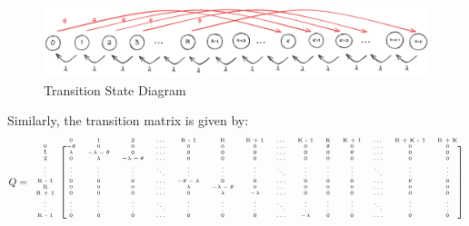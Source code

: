 \documentclass[12pt]{article}
\newcommand{\matindexx}[1]{\mbox{\tiny#1}}%
\begin{document}
\begin{figure}[H]
    \centering
    \includegraphics[width=\textwidth]{Images/Q1.png}
    \caption{Transition State Diagram}
    \label{fig:1-tsd}
\end{figure} 

\noindent Similarly, the transition matrix is given by: \begin{equation*}
    Q = \tiny\begin{blockarray}{ccccccccccccccc}
        & \matindexx{0} & \matindexx{1} & \matindexx{2} & \matindexx{\dots} & \matindexx{R - 1} & \matindexx{R} & \matindexx{R + 1} & \matindexx{\dots} & \matindexx{K - 1} & \matindexx{K} & \matindexx{K + 1} & \matindexx{\dots} & \matindexx{R + K - 1} & \matindexx{R + K} \\ 
        \begin{block}{c[cccccccccccccc]}
            \matindexx{0} & -\theta & 0 & 0 & \dots & 0 & 0 & 0 & \dots & 0 & \theta & 0 & \dots & 0 & 0 \\
            \matindexx{1} & \lambda & -\lambda-\theta & 0 & \dots & 0 & 0 & 0 & \dots & 0 & 0 & \theta & \dots & 0 & 0 \\
            \matindexx{2} & 0 & \lambda & -\lambda-\theta & \dots & 0 & 0 & 0 & \dots & 0 & 0 & 0 & \dots & 0 & 0 \\
            \matindexx{\vdots} & \vdots & \vdots & \vdots & \ddots & \vdots & \vdots & \vdots & \ddots & \vdots & \vdots & \vdots & \ddots & \vdots & \vdots \\
            \matindexx{R - 1} & 0 & 0 & 0 & \dots & -\theta-\lambda & 0 & 0 & \dots & 0 & 0 & 0 & \dots & \theta & 0 \\
            \matindexx{R} & 0 & 0 & 0 & \dots & \lambda & -\lambda-\theta & 0 & \dots & 0 & 0 & 0 & \dots & 0 & 0 \\
            \matindexx{R + 1} & 0 & 0 & 0 & \dots & 0 & \lambda & -\lambda & \dots & 0 & 0 & 0 & \dots & 0 & 0 \\
            \matindexx{\vdots} & \vdots & \vdots & \vdots & \ddots & \vdots & \vdots & \vdots & \ddots & \vdots & \vdots & \vdots & \ddots & \vdots & \vdots \\
            \matindexx{K - 1} & 0 & 0 & 0 & \dots & 0 & 0 & 0 & \dots & -\lambda & 0 & 0 & \dots & 0 & 0 \\

\end{block}
\end{blockarray}
\end{equation*}
\end{document}
